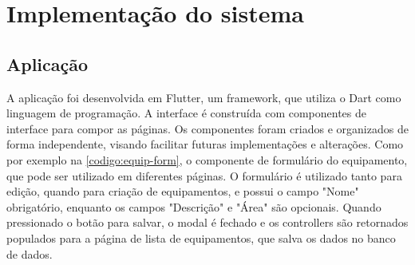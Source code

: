 \section{Implementação do sistema}\label{sec:implementacaoSistema}


\subsection{Aplicação}\label{subsec:aplicacao}
A aplicação foi desenvolvida em Flutter, um framework, que utiliza o Dart como linguagem de programação. A interface é construída com componentes de interface para compor as páginas. Os componentes foram criados e organizados de forma independente, visando facilitar futuras implementações e alterações. Como por exemplo na \autoref{codigo:equip-form}, o componente de formulário do equipamento, que pode ser utilizado em diferentes páginas. O formulário é utilizado tanto para edição, quando para criação de equipamentos, e possui o campo "Nome" obrigatório, enquanto os campos "Descrição" e "Área" são opcionais. Quando pressionado o botão para salvar, o modal é fechado e os controllers são retornados populados para a página de lista de equipamentos, que salva os dados no banco de dados.

